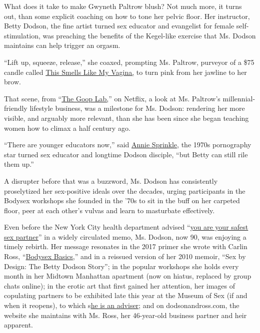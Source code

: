 What does it take to make Gwyneth Paltrow blush? Not much more, it turns
out, than some explicit coaching on how to tone her pelvic floor. Her
instructor, Betty Dodson, the fine artist turned sex educator and
evangelist for female self-stimulation, was preaching the benefits of
the Kegel-like exercise that Ms. Dodson maintains can help trigger an
orgasm.

``Lift up, squeeze, release,'' she coaxed, prompting Ms. Paltrow,
purveyor of a \$75 candle called
\href{https://shop.goop.com/shop/products/this-smells-like-my-vagina-candle?country=USA}{This
Smells Like My Vagina,} to turn pink from her jawline to her brow.

That scene, from ``\href{https://www.netflix.com/title/80244690}{The
Goop Lab,}'' on Netflix, a look at Ms. Paltrow's millennial-friendly
lifestyle business, was a milestone for Ms. Dodson: rendering her more
visible, and arguably more relevant, than she has been since she began
teaching women how to climax a half century ago.

``There are younger educators now,'' said
\href{http://anniesprinkle.org/the-sprinkle-story/}{Annie Sprinkle}, the
1970s pornography star turned sex educator and longtime Dodson disciple,
``but Betty can still rile them up.''

A disrupter before that was a buzzword, Ms. Dodson has consistently
proselytized her sex-positive ideals over the decades, urging
participants in the Bodysex workshops she founded in the '70s to sit in
the buff on her carpeted floor, peer at each other's vulvas and learn to
masturbate effectively.

Even before the New York City health department advised
``\href{https://www1.nyc.gov/assets/doh/downloads/pdf/imm/covid-sex-guidance.pdf}{you
are your safest sex partner}'' in a widely circulated memo, Ms. Dodson,
now 90, was enjoying a timely rebirth. Her message resonates in the 2017
primer she wrote with Carlin Ross,
``\href{https://www.goodreads.com/book/show/38729486-betty-dodson-bodysex-basics}{Bodysex
Basics,}'' and in a reissued version of her 2010 memoir, ``Sex by
Design: The Betty Dodson Story''; in the popular workshops she holds
every month in her Midtown Manhattan apartment (now on hiatus, replaced
by group chats online); in the erotic art that first gained her
attention, her images of copulating partners to be exhibited late this
year at the Museum of Sex (if and when it reopens), to which
s\href{https://www.museumofsex.com/museum/about/advisors/}{he is an
adviser}; and on dodsonandross.com, the website she maintains with Ms.
Ross, her 46-year-old business partner and heir apparent.

